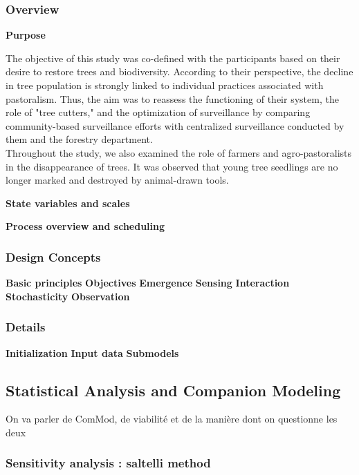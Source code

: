 \documentclass{article}
\begin{document}
    \subsubsection{Overview}

        \textbf{Purpose}

        The objective of this study was co-defined with the participants based on their desire to restore trees and biodiversity. According to their perspective, the decline in tree population is strongly linked to individual practices associated with pastoralism. Thus, the aim was to reassess the functioning of their system, the role of "tree cutters," and the optimization of surveillance by comparing community-based surveillance efforts with centralized surveillance conducted by them and the forestry department.\\

        Throughout the study, we also examined the role of farmers and agro-pastoralists in the disappearance of trees. It was observed that young tree seedlings are no longer marked and destroyed by animal-drawn tools.

        \textbf{State variables and scales}

    
        \textbf{Process overview and scheduling}
        \textbf{}
        \textbf{}
        \textbf{}
        \textbf{}


    \subsubsection{Design Concepts}
        \textbf{Basic principles}
        \textbf{Objectives}
        \textbf{Emergence}
        \textbf{Sensing}
        \textbf{Interaction}
        \textbf{Stochasticity}
        \textbf{Observation}

    \subsubsection{Details}
        \textbf{Initialization}
        \textbf{Input data}
        \textbf{Submodels}


\subsection{Statistical Analysis and Companion Modeling}

On va parler de ComMod, de viabilité et de la manière dont on questionne les deux

    \subsubsection{Sensitivity analysis : saltelli method}
\end{document}
